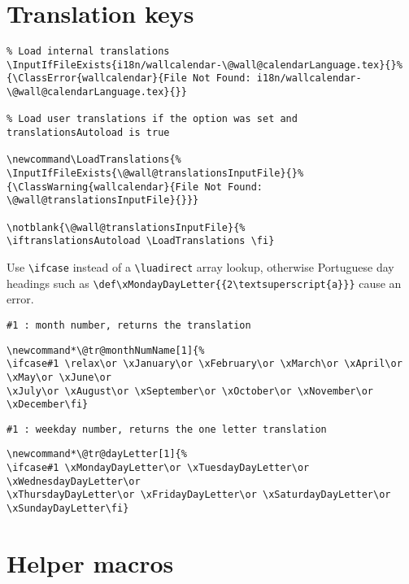 \documentclass[11pt,oneside]{memoir-article}
\begin{document}
\chapter{Translation keys}
\label{sec:org9ce89e8}

\begin{verbatim}
% Load internal translations
\InputIfFileExists{i18n/wallcalendar-\@wall@calendarLanguage.tex}{}%
{\ClassError{wallcalendar}{File Not Found: i18n/wallcalendar-\@wall@calendarLanguage.tex}{}}

% Load user translations if the option was set and translationsAutoload is true

\newcommand\LoadTranslations{%
\InputIfFileExists{\@wall@translationsInputFile}{}%
{\ClassWarning{wallcalendar}{File Not Found: \@wall@translationsInputFile}{}}}

\notblank{\@wall@translationsInputFile}{%
\iftranslationsAutoload \LoadTranslations \fi}
\end{verbatim}

Use \texttt{\textbackslash{}ifcase} instead of a \texttt{\textbackslash{}luadirect} array lookup, otherwise Portuguese day
headings such as \texttt{\textbackslash{}def\textbackslash{}xMondayDayLetter\{\{2\textbackslash{}textsuperscript\{a\}\}\}} cause an error.

\begin{verbatim}
#1 : month number, returns the translation
\end{verbatim}

\begin{verbatim}
\newcommand*\@tr@monthNumName[1]{%
\ifcase#1 \relax\or \xJanuary\or \xFebruary\or \xMarch\or \xApril\or \xMay\or \xJune\or
\xJuly\or \xAugust\or \xSeptember\or \xOctober\or \xNovember\or \xDecember\fi}
\end{verbatim}

\begin{verbatim}
#1 : weekday number, returns the one letter translation 
\end{verbatim}

\begin{verbatim}
\newcommand*\@tr@dayLetter[1]{%
\ifcase#1 \xMondayDayLetter\or \xTuesdayDayLetter\or \xWednesdayDayLetter\or
\xThursdayDayLetter\or \xFridayDayLetter\or \xSaturdayDayLetter\or \xSundayDayLetter\fi}
\end{verbatim}

\chapter{Helper macros}
\label{sec:org3563e80}
\end{document}
